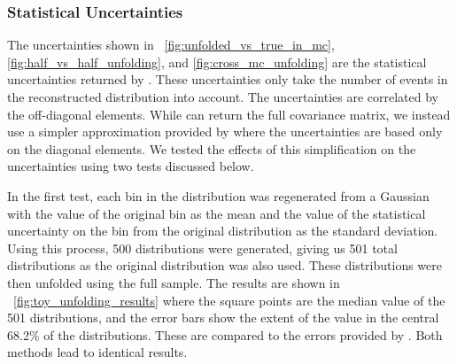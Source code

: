 \subsubsection{Statistical Uncertainties}
\label{ssec:unfolding_statistical_uncertainties}

The uncertainties shown in \FIGS~\ref{fig:unfolded_vs_true_in_mc},
\ref{fig:half_vs_half_unfolding}, and \ref{fig:cross_mc_unfolding} are the
statistical uncertainties returned by \RooUnfold. These uncertainties only take
the number of events in the reconstructed distribution into account. The
uncertainties are correlated by the off-diagonal elements. While \RooUnfold can
return the full covariance matrix, we instead use a simpler approximation
provided by \RooUnfold where the uncertainties are based only on the diagonal
elements. We tested the effects of this simplification on the uncertainties
using two tests discussed below.

In the first test, each bin in the \POWHEG \phistar distribution was
regenerated from a Gaussian with the value of the original bin as the mean and
the value of the statistical uncertainty on the bin from the original
distribution as the standard deviation. Using this process, \num{500} \phistar
distributions were generated, giving us \num{501} total distributions as the
original distribution was also used. These distributions were then unfolded
using the full \MADGRAPH sample. The results are shown in
\FIG~\ref{fig:toy_unfolding_results} where the square points are the median
value of the 501 distributions, and the error bars show the extent of the value
in the central 68.2\% of the distributions. These are compared to the errors
provided by \RooUnfold. Both methods lead to identical results.

